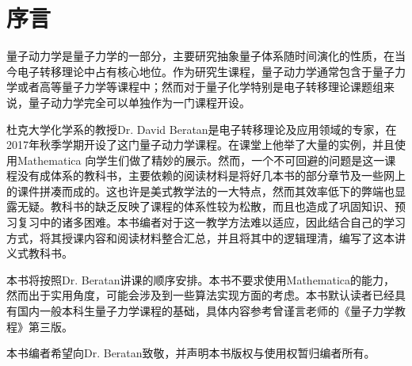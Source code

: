 
\chapter*{序言}
量子动力学是量子力学的一部分，主要研究抽象量子体系随时间演化的性质，在当今电子转移理论中占有核心地位。作为研究生课程，量子动力学通常包含于量子力学或者高等量子力学等课程中；然而对于量子化学特别是电子转移理论课题组来说，量子动力学完全可以单独作为一门课程开设。

杜克大学化学系的教授Dr. David Beratan是电子转移理论及应用领域的专家，在2017年秋季学期开设了这门量子动力学课程。在课堂上他举了大量的实例，并且使用Mathematica 向学生们做了精妙的展示。然而，一个不可回避的问题是这一课程没有成体系的教科书，主要依赖的阅读材料是将好几本书的部分章节及一些网上的课件拼凑而成的。这也许是美式教学法的一大特点，然而其效率低下的弊端也显露无疑。教科书的缺乏反映了课程的体系性较为松散，而且也造成了巩固知识、预习复习中的诸多困难。本书编者对于这一教学方法难以适应，因此结合自己的学习方式，将其授课内容和阅读材料整合汇总，并且将其中的逻辑理清，编写了这本讲义式教科书。

本书将按照Dr. Beratan讲课的顺序安排。本书不要求使用Mathematica的能力，然而出于实用角度，可能会涉及到一些算法实现方面的考虑。本书默认读者已经具有国内一般本科生量子力学课程的基础，具体内容参考曾谨言老师的《量子力学教程》第三版。

本书编者希望向Dr. Beratan致敬，并声明本书版权与使用权暂归编者所有。


